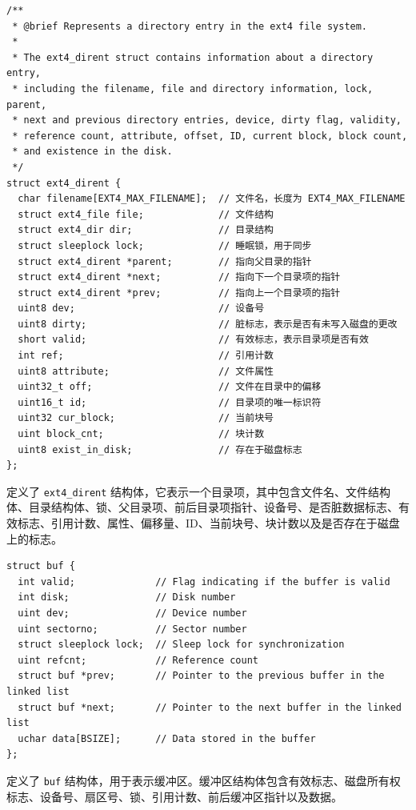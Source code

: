 \documentclass[UTF8]{article}
\begin{document}
\begin{lstlisting}[style=c-style]
/**
 * @brief Represents a directory entry in the ext4 file system.
 * 
 * The ext4_dirent struct contains information about a directory entry,
 * including the filename, file and directory information, lock, parent,
 * next and previous directory entries, device, dirty flag, validity,
 * reference count, attribute, offset, ID, current block, block count,
 * and existence in the disk.
 */
struct ext4_dirent {
  char filename[EXT4_MAX_FILENAME];  // 文件名，长度为 EXT4_MAX_FILENAME
  struct ext4_file file;             // 文件结构
  struct ext4_dir dir;               // 目录结构
  struct sleeplock lock;             // 睡眠锁，用于同步
  struct ext4_dirent *parent;        // 指向父目录的指针
  struct ext4_dirent *next;          // 指向下一个目录项的指针
  struct ext4_dirent *prev;          // 指向上一个目录项的指针
  uint8 dev;                         // 设备号
  uint8 dirty;                       // 脏标志，表示是否有未写入磁盘的更改
  short valid;                       // 有效标志，表示目录项是否有效
  int ref;                           // 引用计数
  uint8 attribute;                   // 文件属性
  uint32_t off;                      // 文件在目录中的偏移
  uint16_t id;                       // 目录项的唯一标识符
  uint32 cur_block;                  // 当前块号
  uint block_cnt;                    // 块计数
  uint8 exist_in_disk;               // 存在于磁盘标志
};
\end{lstlisting}

定义了 \texttt{ext4\_dirent} 结构体，它表示一个目录项，其中包含文件名、文件结构体、目录结构体、锁、父目录项、前后目录项指针、设备号、是否脏数据标志、有效标志、引用计数、属性、偏移量、ID、当前块号、块计数以及是否存在于磁盘上的标志。

\begin{lstlisting}[style=c-style]
struct buf {
  int valid;              // Flag indicating if the buffer is valid
  int disk;               // Disk number
  uint dev;               // Device number
  uint sectorno;          // Sector number
  struct sleeplock lock;  // Sleep lock for synchronization
  uint refcnt;            // Reference count
  struct buf *prev;       // Pointer to the previous buffer in the linked list
  struct buf *next;       // Pointer to the next buffer in the linked list
  uchar data[BSIZE];      // Data stored in the buffer
};
\end{lstlisting}
定义了 \texttt{buf} 结构体，用于表示缓冲区。缓冲区结构体包含有效标志、磁盘所有权标志、设备号、扇区号、锁、引用计数、前后缓冲区指针以及数据。
\end{document}

